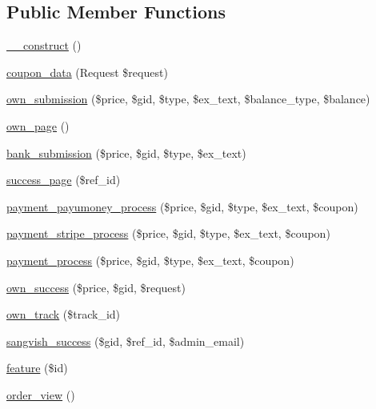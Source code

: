 \subsection*{Public Member Functions}
\begin{DoxyCompactItemize}
\item 
\mbox{\hyperlink{class_responsive_1_1_http_1_1_controllers_1_1_order_controller_a095c5d389db211932136b53f25f39685}{\+\_\+\+\_\+construct}} ()
\item 
\mbox{\hyperlink{class_responsive_1_1_http_1_1_controllers_1_1_order_controller_a38b94a76ba7d2095c4e69319466928c2}{coupon\+\_\+data}} (Request \$request)
\item 
\mbox{\hyperlink{class_responsive_1_1_http_1_1_controllers_1_1_order_controller_a6192b51d4089dcce6f25b8a866c105ef}{own\+\_\+submission}} (\$price, \$gid, \$type, \$ex\+\_\+text, \$balance\+\_\+type, \$balance)
\item 
\mbox{\hyperlink{class_responsive_1_1_http_1_1_controllers_1_1_order_controller_a69e28a94775ef5e274ed0a73f471fe4e}{own\+\_\+page}} ()
\item 
\mbox{\hyperlink{class_responsive_1_1_http_1_1_controllers_1_1_order_controller_ab815b5f462e7953db008052631be760c}{bank\+\_\+submission}} (\$price, \$gid, \$type, \$ex\+\_\+text)
\item 
\mbox{\hyperlink{class_responsive_1_1_http_1_1_controllers_1_1_order_controller_aff08e6d23e1e359171985625ca1d6b47}{success\+\_\+page}} (\$ref\+\_\+id)
\item 
\mbox{\hyperlink{class_responsive_1_1_http_1_1_controllers_1_1_order_controller_af14a5275fd668010ead7c1f4d82fe778}{payment\+\_\+payumoney\+\_\+process}} (\$price, \$gid, \$type, \$ex\+\_\+text, \$coupon)
\item 
\mbox{\hyperlink{class_responsive_1_1_http_1_1_controllers_1_1_order_controller_aaa3531883a947bece074bf3e9687b552}{payment\+\_\+stripe\+\_\+process}} (\$price, \$gid, \$type, \$ex\+\_\+text, \$coupon)
\item 
\mbox{\hyperlink{class_responsive_1_1_http_1_1_controllers_1_1_order_controller_a8f9a4e44b3365c7ad598fe790f738930}{payment\+\_\+process}} (\$price, \$gid, \$type, \$ex\+\_\+text, \$coupon)
\item 
\mbox{\hyperlink{class_responsive_1_1_http_1_1_controllers_1_1_order_controller_aecb3359d94e561b329b3c8c5ef54a62c}{own\+\_\+success}} (\$price, \$gid, \$request)
\item 
\mbox{\hyperlink{class_responsive_1_1_http_1_1_controllers_1_1_order_controller_afbc583bcbc53e286acb0a350770a0ec3}{own\+\_\+track}} (\$track\+\_\+id)
\item 
\mbox{\hyperlink{class_responsive_1_1_http_1_1_controllers_1_1_order_controller_addb6aac1567fa6da7146944f30063322}{sangvish\+\_\+success}} (\$gid, \$ref\+\_\+id, \$admin\+\_\+email)
\item 
\mbox{\hyperlink{class_responsive_1_1_http_1_1_controllers_1_1_order_controller_ad4318a6b3d8bb110cb44af152f9df7f1}{feature}} (\$id)
\item 
\mbox{\hyperlink{class_responsive_1_1_http_1_1_controllers_1_1_order_controller_a221b305fa5e607dc92641f05c4d75559}{order\+\_\+view}} ()
\end{DoxyCompactItemize}
